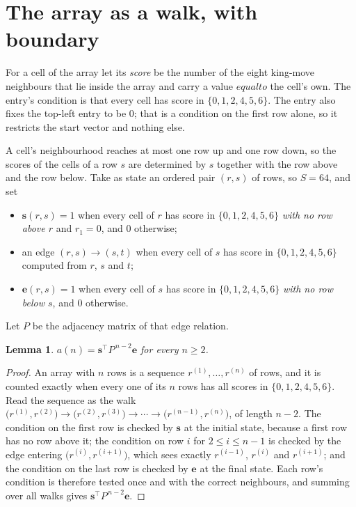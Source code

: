 \documentclass[11pt,a4paper]{article}
\theoremstyle{plain}
\newtheorem{lemma}[theorem]{Lemma}
\theoremstyle{definition}
\begin{document}
\section{The array as a walk, with boundary}

For a cell of the array let its \emph{score} be the number of the eight king-move neighbours that lie inside
the array and carry a value $equal to$ the cell's own. The entry's condition is that every cell
has score in $\{0,1,2,4,5,6\}$. The entry also fixes the top-left entry to be $0$; that is a condition on the first row alone, so it restricts the start vector and nothing else.

A cell's neighbourhood reaches at most one row up and one row down, so the scores of the
cells of a row $s$ are determined by $s$ together with the row above and the row below.
Take as state an ordered pair $(r,s)$ of rows, so $S=64$, and set
\begin{itemize}
\item $\mathbf{s}(r,s)=1$ when every cell of $r$ has score in $\{0,1,2,4,5,6\}$ \emph{with no row
above $r$} and $r_1=0$, and $0$ otherwise;
\item an edge $(r,s)\to(s,t)$ when every cell of $s$ has score in $\{0,1,2,4,5,6\}$ computed from
$r$, $s$ and $t$;
\item $\mathbf{e}(r,s)=1$ when every cell of $s$ has score in $\{0,1,2,4,5,6\}$ \emph{with no row
below $s$}, and $0$ otherwise.
\end{itemize}
Let $P$ be the adjacency matrix of that edge relation.

\begin{lemma}\label{lem:walk}
$a(n)=\mathbf{s}^{\!\top}P^{\,n-2}\mathbf{e}$ for every $n\ge2$.
\end{lemma}

\begin{proof}
An array with $n$ rows is a sequence $r^{(1)},\dots,r^{(n)}$ of rows, and it is counted
exactly when every one of its $n$ rows has all scores in $\{0,1,2,4,5,6\}$. Read the sequence as the
walk $\bigl(r^{(1)},r^{(2)}\bigr)\to\bigl(r^{(2)},r^{(3)}\bigr)\to\cdots\to
\bigl(r^{(n-1)},r^{(n)}\bigr)$, of length $n-2$. The condition on the first row is
checked by $\mathbf{s}$ at the initial state, because a first row has no row above it; the
condition on row $i$ for $2\le i\le n-1$ is checked by the edge entering
$\bigl(r^{(i)},r^{(i+1)}\bigr)$, which sees exactly $r^{(i-1)}$, $r^{(i)}$ and
$r^{(i+1)}$; and the condition on the last row is checked by $\mathbf{e}$ at the final
state. Each row's condition is therefore tested once and with the correct neighbours, and
summing over all walks gives $\mathbf{s}^{\!\top}P^{\,n-2}\mathbf{e}$.
\end{proof}
\end{document}
